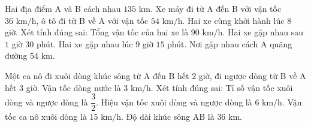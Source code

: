\begin{ex} %
Hai địa điểm A và B cách nhau $135\text{ km}$. Xe máy đi từ A đến B với vận tốc $36\text{ km/h}$, ô tô đi từ B về A với vận tốc $54\text{ km/h}$. Hai xe cùng khởi hành lúc $8$ giờ. Xét tính đúng sai:
\choiceTF
{\True Tổng vận tốc của hai xe là $90\text{ km/h}$.}
{\True Hai xe gặp nhau sau $1$ giờ $30$ phút.}
{Hai xe gặp nhau lúc $9$ giờ $15$ phút.}
{\True Nơi gặp nhau cách A quãng đường $54\text{ km}$.}
\end{ex}

\begin{ex} %
Một ca nô đi xuôi dòng khúc sông từ A đến B hết $2$ giờ, đi ngược dòng từ B về A hết $3$ giờ. Vận tốc dòng nước là $3\text{ km/h}$. Xét tính đúng sai:
\choiceTF
{\True Tỉ số vận tốc xuôi dòng và ngược dòng là $\dfrac{3}{2}$.}
{\True Hiệu vận tốc xuôi dòng và ngược dòng là $6\text{ km/h}$.}
{Vận tốc ca nô xuôi dòng là $15\text{ km/h}$.}
{\True Độ dài khúc sông AB là $36\text{ km}$.}
\end{ex}

